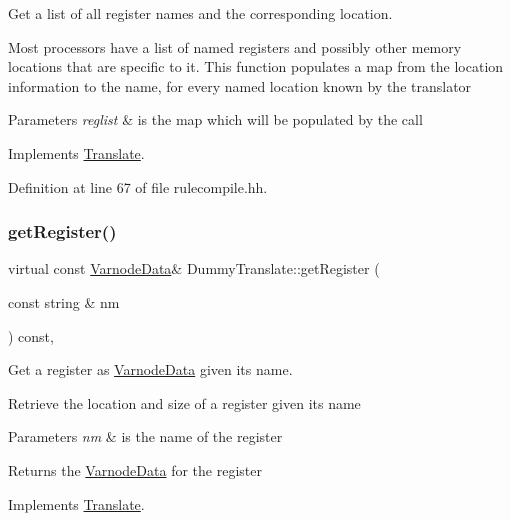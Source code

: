 Get a list of all register names and the corresponding location. 

Most processors have a list of named registers and possibly other memory locations that are specific to it. This function populates a map from the location information to the name, for every named location known by the translator 
\begin{DoxyParams}{Parameters}
{\em reglist} & is the map which will be populated by the call \\
\hline
\end{DoxyParams}


Implements \mbox{\hyperlink{class_translate_a4de12a5d1ad5f080604451e2ed3c163e}{Translate}}.



Definition at line 67 of file rulecompile.\+hh.

\mbox{\label{class_dummy_translate_a4c030a80bc088c90ffff5b7a0a78434d}} 
\subsubsection{\texorpdfstring{getRegister()}{getRegister()}}
{\footnotesize\ttfamily virtual const \mbox{\hyperlink{struct_varnode_data}{Varnode\+Data}}\& Dummy\+Translate\+::get\+Register (\begin{DoxyParamCaption}\item[{const string \&}]{nm }\end{DoxyParamCaption}) const\hspace{0.3cm}{\ttfamily [inline]}, {\ttfamily [virtual]}}



Get a register as \mbox{\hyperlink{struct_varnode_data}{Varnode\+Data}} given its name. 

Retrieve the location and size of a register given its name 
\begin{DoxyParams}{Parameters}
{\em nm} & is the name of the register \\
\hline
\end{DoxyParams}
\begin{DoxyReturn}{Returns}
the \mbox{\hyperlink{struct_varnode_data}{Varnode\+Data}} for the register 
\end{DoxyReturn}


Implements \mbox{\hyperlink{class_translate_a3a62c460db4eccc285fa3dd29dd4a29b}{Translate}}.



